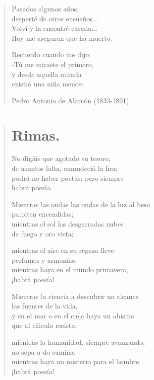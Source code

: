 \documentclass[12pt, twoside]{book}
\begin{document}
\begin{verse}
Pasados algunos años,\\
desperté de otros ensueños...\\
Volví y la encontré casada...\\
Hoy me aseguran que ha muerto.
\newline

Recuerdo cuando me dijo:\\
-Tú me miraste el primero,\\
y desde aquella mirada\\
existió una niña menos-.
\newline

Pedro Antonio de Alarcón (1833-1891)
\end{verse}

\newpage
\begin{verse}
\begin{center}
\section{Rimas.}
\end{center}
No digáis que agotado su tesoro,\\
de asuntos falta, enmudeció la lira;\\
podrá no haber poetas; pero siempre\\
habrá poesía.
\newline

Mientras las ondas las ondas de la luz al beso\\
palpiten encendidas;\\
mientras el sol las desgarradas nubes\\
de fuego y oro vista;
\newline

mientras el aire en su regazo lleve\\
perfumes y armonías;\\
mientras haya en el mundo primavera,\\
¡habrá poesía!
\newline

Mientras la ciencia a descubrir no alcance\\
las fuentes de la vida,\\
y en el mar o en el cielo haya un abismo\\
que al cálculo resista;
\newline

mientras la humanidad, siempre avanzando,\\
no sepa a do camina;\\
mientras haya un misterio para el hombre,\\
¡habrá poesía!
\newline


\end{verse}
\end{document}
